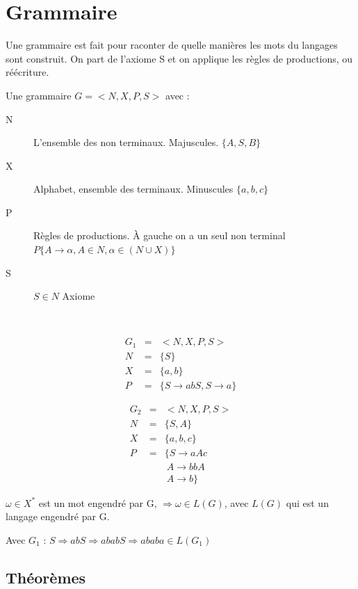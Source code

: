 \documentclass[12pt,a4paper,openany]{book}
\begin{document}
	\section{Grammaire}
	Une grammaire est fait pour raconter de quelle manières les mots du langages sont construit. On part de l'axiome S et on applique les règles de
	productions, ou réécriture.

	Une grammaire $G=<N,X,P,S>$ avec : 
	\begin{description}
		\item[N] L'ensemble des non terminaux. Majuscules. $\{A,S,B\}$
		\item[X] Alphabet, ensemble des terminaux. Minuscules $\{a,b,c\}$
		\item[P] Règles de productions. À gauche on a un seul non terminal $P\{A \rightarrow \alpha, A\in N, \alpha\in(N \cup X)\}$ 
		\item[S] $S\in N$ Axiome 
	\end{description}
	~

	\begin{exemple}
		\begin{eqnarray*}
			G_1&=& <N,X,P,S>\\
			N&=& \{S\}\\
			X&=& \{a,b\}\\
			P&=& \{S \rightarrow abS, S\rightarrow a\}
		\end{eqnarray*}
	\end{exemple}
	\begin{exemple}
		\begin{eqnarray*}
			G_2 &=&  <N,X,P,S>\\
			N &=& \{S,A\}\\
			X&=& \{a,b,c\}\\
			P&=& \{S \rightarrow aAc\\
			&& \ A\rightarrow bbA\\
			&& \ A\rightarrow b\}
		\end{eqnarray*}
	\end{exemple}

	$\omega \in X^*$ est un mot engendré par G, $\Rightarrow \omega \in L(G)$, avec $L(G)$ qui est un langage engendré par G.

	\begin{exemple}
		Avec $G_1$ : 
		$S \Rightarrow abS \Rightarrow ababS \Rightarrow ababa\in L(G_1)$
	\end{exemple}

	\subsection{Théorèmes}
\end{document}
